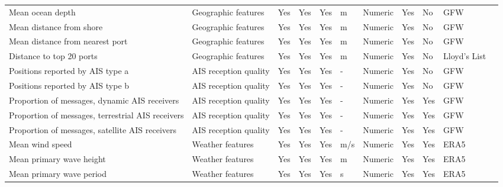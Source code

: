 \begin{table}[!h]
\begin{tabular}[t]{lllllllllll}
Mean ocean depth & Geographic features  & Yes & Yes & Yes & m & Numeric & Yes & No & GFW & \cite{kroodsma2018tracking}\\
Mean distance from shore & Geographic features  & Yes & Yes & Yes & m & Numeric & Yes & No & GFW & \cite{kroodsma2018tracking}\\
Mean distance from nearest port & Geographic features  & Yes & Yes & Yes & m & Numeric & Yes & No & GFW & \cite{kroodsma2018tracking}\\
Distance to top 20 ports & Geographic features  & Yes & Yes & Yes & m & Numeric & Yes & No & Lloyd’s List & \cite{LloydsListTopPorts2024}\\
\addlinespace
Positions reported by AIS type a & AIS reception quality & Yes & Yes & Yes & - & Numeric & Yes & No & GFW & \cite{kroodsma2018tracking}\\
Positions reported by AIS type b & AIS reception quality & Yes & Yes & Yes & - & Numeric & Yes & No & GFW & \cite{kroodsma2018tracking}\\
Proportion of messages, dynamic AIS receivers & AIS reception quality & Yes & Yes & Yes & - & Numeric & Yes & Yes & GFW & \cite{kroodsma2018tracking}\\
Proportion of messages, terrestrial AIS receivers & AIS reception quality & Yes & Yes & Yes & - & Numeric & Yes & Yes & GFW & \cite{kroodsma2018tracking}\\
Proportion of messages, satellite AIS receivers & AIS reception quality & Yes & Yes & Yes & - & Numeric & Yes & Yes & GFW & \cite{kroodsma2018tracking}\\
\addlinespace
Mean wind speed & Weather features & Yes & Yes & Yes & m/s & Numeric & Yes & Yes & ERA5 & \cite{era5cds2023}\\
Mean primary wave height & Weather features & Yes & Yes & Yes & m & Numeric & Yes & Yes & ERA5 & \cite{era5cds2023}\\
Mean primary wave period & Weather features & Yes & Yes & Yes & s & Numeric & Yes & Yes & ERA5 & \cite{era5cds2023}\\
\bottomrule
\end{tabular}
\end{table}
